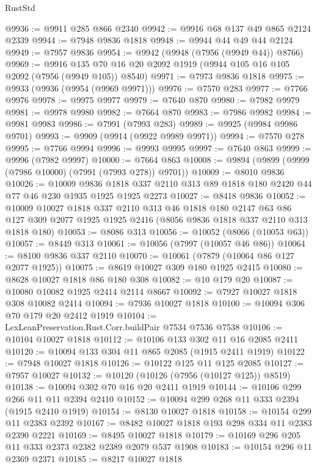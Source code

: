 \begin{lexlean}{RustStd}
\begin{coremodule}
@9936 := @9911 @285 @866 @2340
@9942 := @9916 @68 @137 @49 @865 @2124 @2339
@9944 := @7948 @9836 @1818
@9948 := @9944 @44 @49 @44 @2124
@9949 := @7957 @9836
@9954 := @9942 (@9948 (@7956 (@9949 @44)) @8766)
@9969 := @9916 @135 @70 @16 @20 @2092 @1919 (@9944 @105 @16 @105 @2092 (@7956 (@9949 @105)) @8540)
@9971 := @7973 @9836 @1818
@9975 := @9933 (@9936 (@9954 (@9969 @9971)))
@9976 := @7570 @283
@9977 := @7766 @9976
@9978 := @9975 @9977
@9979 := @7640 @870
@9980 := @7982 @9979
@9981 := @9978 @9980
@9982 := @7664 @870
@9983 := @7986 @9982
@9984 := @9981 @9983
@9986 := @7991 (@7993 @283)
@9989 := @9925 (@9984 @9986 @9701)
@9993 := @9909 (@9914 (@9922 @9989 @9971))
@9994 := @7570 @278
@9995 := @7766 @9994
@9996 := @9993 @9995
@9997 := @7640 @863
@9999 := @9996 (@7982 @9997)
@10000 := @7664 @863
@10008 := @9894 (@9899 (@9999 (@7986 @10000) (@7991 (@7993 @278)) @9701))
@10009 := @8010 @9836
@10026 := @10009
    @9836
    @1818
    @337
    @2110
    @313
    @89
    @1818
    @180
    @2420
    @44
    @77
    @46
    @230
    @1935
    @1925
    @1925
    @2273
@10027 := @8418 @9836
@10052 := @10009
    @10027
    @1818
    @337
    @2110
    @313
    @46
    @1818
    @180
    @2147
    @63
    @86
    @127
    @309
    @2077
    @1925
    @1925
    @2416
    (@8056 @9836 @1818 @337 @2110 @313 @1818 @180)
@10053 := @8086 @313
@10056 := @10052 (@8066 (@10053 @63))
@10057 := @8449 @313
@10061 := @10056 (@7997 (@10057 @46 @86))
@10064 := @8100 @9836 @337 @2110
@10070 := @10061 (@7879 (@10064 @86 @127 @2077 @1925))
@10075 := @8619 @10027 @309 @180 @1925 @2415
@10080 := @8628 @10027 @1818 @86 @180 @308
@10082 := @10 @179 @20
@10087 := @10080 @10082 @1925 @2414 @2114 @8667
@10092 := @7927 @10027 @1818 @308 @10082 @2414
@10094 := @7936 @10027 @1818
@10100 := @10094 @306 @70 @179 @20 @2412 @1919
@10104 := LexLeanPreservation.Rust.Corr.buildPair @7534 @7536 @7538
@10106 := @10104 @10027 @1818
@10112 := @10106 @133 @302 @11 @16 @2085 @2411
@10120 := @10094 @133 @304 @11 @865 @2085 (@1915 @2411 @1919)
@10122 := @7948 @10027 @1818
@10126 := @10122 @125 @11 @125 @2085
@10127 := @7957 @10027
@10132 := @10120 (@10126 (@7956 (@10127 @125)) @8519)
@10138 := @10094 @302 @70 @16 @20 @2411 @1919
@10144 := @10106 @299 @266 @11 @11 @2394 @2410
@10152 := @10094 @299 @268 @11 @333 @2394 (@1915 @2410 @1919)
@10154 := @8130 @10027 @1818
@10158 := @10154 @299 @11 @2383 @2392
@10167 := @8482 @10027 @1818 @193 @298 @334 @11 @2383 @2390 @2221
@10169 := @8495 @10027 @1818
@10179 := @10169 @296 @205 @11 @333 @2373 @2382 @2389 @2079 @537 @1908
@10183 := @10154 @296 @11 @2369 @2371
@10185 := @8217 @10027 @1818

\end{coremodule}
\end{lexlean}
